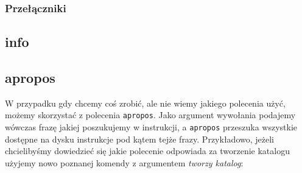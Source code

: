 \documentclass[10 pt, a4paper, draft]{report}
\begin{document}
\subsubsection*{Przełączniki}
\subsection{info}
\subsection{apropos}
W przypadku gdy chcemy coś zrobić, ale nie wiemy jakiego polecenia użyć, możemy skorzystać z polecenia \texttt{apropos}. Jako argument wywołania podajemy wówczas frazę jakiej poszukujemy w instrukcji, a \texttt{apropos} przeszuka wszystkie dostępne na dysku instrukcje pod kątem tejże frazy. Przykładowo, jeżeli chcielibyśmy dowiedzieć się jakie polecenie odpowiada za tworzenie katalogu  użyjemy nowo poznanej komendy z argumentem \textit{tworzy katalog}:
\newline

\clearpage
{}
\printindex
\end{document}

